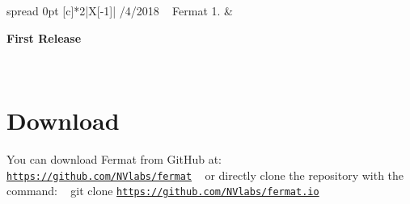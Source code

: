 \begin{DoxyParagraph}{}
\tabulinesep=1mm
\begin{longtabu} spread 0pt [c]{*{2}{|X[-1]}|}
/4/2018 ~\newline
 Fermat 1. &
\begin{DoxyItemize}
\item {\bfseries First Release}  
\end{DoxyItemize}\\
\end{longtabu}

\end{DoxyParagraph}
\hypertarget{index_DownloadSection}{}\section{Download}\label{index_DownloadSection}
\begin{DoxyParagraph}{}
You can download Fermat from Git\+Hub at\+: ~\newline
 \href{https://github.com/NVlabs/fermat}{\tt https\+://github.\+com/\+N\+Vlabs/fermat} ~\newline
 or directly clone the repository with the command\+: ~\newline
 git clone \href{https://github.com/NVlabs/fermat.io}{\tt https\+://github.\+com/\+N\+Vlabs/fermat.\+io}
\end{DoxyParagraph}
 